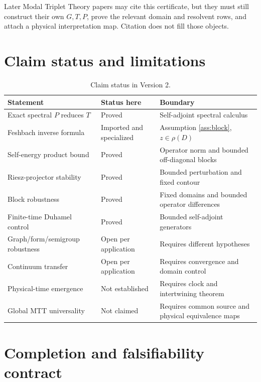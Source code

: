 \documentclass[11pt]{article}
\theoremstyle{definition}
\theoremstyle{remark}
\newcommand{\1}{\mathbf 1}
\newcommand{\MTT}{Modal Triplet Theory}
\begin{document}
Later \MTT{} papers may cite this certificate, but they must still construct
their own \(G,T,P\), prove the relevant domain and resolvent rows, and
attach a physical interpretation map.  Citation does not fill those
objects.

\section{Claim status and limitations}
\label{sec:status}

\begin{table}[htbp]
\centering
\small
\begin{tabularx}{\textwidth}{L{0.29\textwidth}L{0.18\textwidth}Y}
\toprule
Statement & Status here & Boundary \\
\midrule
Exact spectral \(P\) reduces \(T\)
& Proved
& Self-adjoint spectral calculus \\
Feshbach inverse formula
& Imported and specialized
& Assumption \ref{ass:block}, \(z\in\rho(D)\) \\
Self-energy product bound
& Proved
& Operator norm and bounded off-diagonal blocks \\
Riesz-projector stability
& Proved
& Bounded perturbation and fixed contour \\
Block robustness
& Proved
& Fixed domains and bounded operator differences \\
Finite-time Duhamel control
& Proved
& Bounded self-adjoint generators \\
Graph/form/semigroup robustness
& Open per application
& Requires different hypotheses \\
Continuum transfer
& Open per application
& Requires convergence and domain control \\
Physical-time emergence
& Not established
& Requires clock and intertwining theorem \\
Global MTT universality
& Not claimed
& Requires common source and physical equivalence maps \\
\bottomrule
\end{tabularx}
\caption{Claim status in Version 2.}
\label{tab:status}
\end{table}

\section{Completion and falsifiability contract}
\label{sec:completion}
\end{document}
